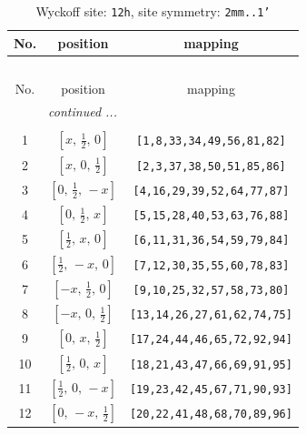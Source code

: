 \documentclass[fleqn,8pt]{jsarticle}
\begin{document}
\begin{longtable}{ccc}
\caption{Wyckoff site: {\tt 12h}, site symmetry: {\tt 2mm..1'}}
 \\
 \hline \hline
No. & position & mapping \\ \hline \endfirsthead

\multicolumn{2}{l}{\tablename\ \thetable{}} \\
 \hline \hline
No. & position & mapping \\ \hline \endhead

 \hline \hline
\multicolumn{2}{r}{\footnotesize\it continued ...} \\ \endfoot

 \hline \hline
\multicolumn{2}{r}{} \\ \endlastfoot

1 & $\left[ x,\, \frac{1}{2},\, 0 \right]$ & {\tt [1,8,33,34,49,56,81,82]} \\ \hline
2 & $\left[ x,\, 0,\, \frac{1}{2} \right]$ & {\tt [2,3,37,38,50,51,85,86]} \\ \hline
3 & $\left[ 0,\, \frac{1}{2},\, - x \right]$ & {\tt [4,16,29,39,52,64,77,87]} \\ \hline
4 & $\left[ 0,\, \frac{1}{2},\, x \right]$ & {\tt [5,15,28,40,53,63,76,88]} \\ \hline
5 & $\left[ \frac{1}{2},\, x,\, 0 \right]$ & {\tt [6,11,31,36,54,59,79,84]} \\ \hline
6 & $\left[ \frac{1}{2},\, - x,\, 0 \right]$ & {\tt [7,12,30,35,55,60,78,83]} \\ \hline
7 & $\left[ - x,\, \frac{1}{2},\, 0 \right]$ & {\tt [9,10,25,32,57,58,73,80]} \\ \hline
8 & $\left[ - x,\, 0,\, \frac{1}{2} \right]$ & {\tt [13,14,26,27,61,62,74,75]} \\ \hline
9 & $\left[ 0,\, x,\, \frac{1}{2} \right]$ & {\tt [17,24,44,46,65,72,92,94]} \\ \hline
10 & $\left[ \frac{1}{2},\, 0,\, x \right]$ & {\tt [18,21,43,47,66,69,91,95]} \\ \hline
11 & $\left[ \frac{1}{2},\, 0,\, - x \right]$ & {\tt [19,23,42,45,67,71,90,93]} \\ \hline
12 & $\left[ 0,\, - x,\, \frac{1}{2} \right]$ & {\tt [20,22,41,48,68,70,89,96]} \\
\end{longtable}
\renewcommand{\arraystretch}{1.2}
\end{document}
